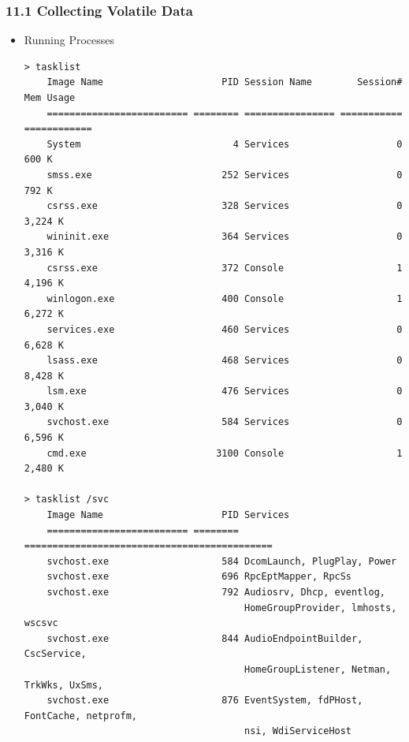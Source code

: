 \begin{frame}[fragile]
  \frametitle{11.1 Collecting Volatile Data}
  \begin{itemize}
        \item Running Processes
\begin{lstlisting}[basicstyle=\tiny]
> tasklist
    Image Name                     PID Session Name        Session#    Mem Usage
    ========================= ======== ================ =========== ============
    System                           4 Services                   0        600 K
    smss.exe                       252 Services                   0        792 K
    csrss.exe                      328 Services                   0      3,224 K
    wininit.exe                    364 Services                   0      3,316 K
    csrss.exe                      372 Console                    1      4,196 K
    winlogon.exe                   400 Console                    1      6,272 K
    services.exe                   460 Services                   0      6,628 K
    lsass.exe                      468 Services                   0      8,428 K
    lsm.exe                        476 Services                   0      3,040 K
    svchost.exe                    584 Services                   0      6,596 K
    cmd.exe                       3100 Console                    1      2,480 K

> tasklist /svc
    Image Name                     PID Services
    ========================= ======== ============================================
    svchost.exe                    584 DcomLaunch, PlugPlay, Power
    svchost.exe                    696 RpcEptMapper, RpcSs
    svchost.exe                    792 Audiosrv, Dhcp, eventlog,
                                       HomeGroupProvider, lmhosts, wscsvc
    svchost.exe                    844 AudioEndpointBuilder, CscService,
                                       HomeGroupListener, Netman, TrkWks, UxSms,
    svchost.exe                    876 EventSystem, fdPHost, FontCache, netprofm,
                                       nsi, WdiServiceHost
\end{lstlisting}
    \end{itemize}
\end{frame}


